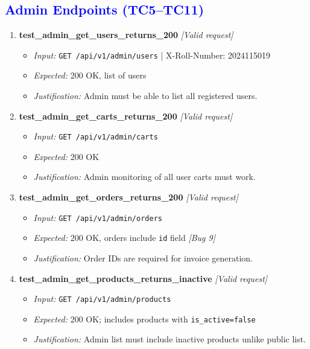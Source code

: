 \documentclass{article}
\begin{document}
\subsection*{\textcolor{blue}{Admin Endpoints (TC5--TC11)}}
\begin{enumerate}[resume, label=\textbf{TC\arabic*.}]

\item \textbf{test\_admin\_get\_users\_returns\_200} \textit{[Valid request]}
\begin{itemize}[noitemsep]
  \item \textit{Input:} \texttt{GET /api/v1/admin/users} | X-Roll-Number: 2024115019
  \item \textit{Expected:} 200 OK, list of users
  \item \textit{Justification:} Admin must be able to list all registered users.
\end{itemize}

\item \textbf{test\_admin\_get\_carts\_returns\_200} \textit{[Valid request]}
\begin{itemize}[noitemsep]
  \item \textit{Input:} \texttt{GET /api/v1/admin/carts}
  \item \textit{Expected:} 200 OK
  \item \textit{Justification:} Admin monitoring of all user carts must work.
\end{itemize}

\item \textbf{test\_admin\_get\_orders\_returns\_200} \textit{[Valid request]}
\begin{itemize}[noitemsep]
  \item \textit{Input:} \texttt{GET /api/v1/admin/orders}
  \item \textit{Expected:} 200 OK, orders include \texttt{id} field \textit{[Bug 9]}
  \item \textit{Justification:} Order IDs are required for invoice generation.
\end{itemize}

\item \textbf{test\_admin\_get\_products\_returns\_inactive} \textit{[Valid request]}
\begin{itemize}[noitemsep]
  \item \textit{Input:} \texttt{GET /api/v1/admin/products}
  \item \textit{Expected:} 200 OK; includes products with \texttt{is\_active=false}
  \item \textit{Justification:} Admin list must include inactive products unlike public list.
\end{itemize}


\end{enumerate}
\end{document}
